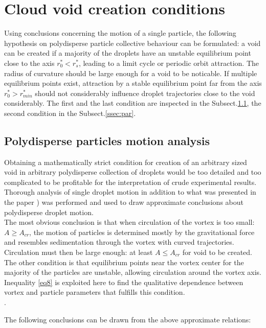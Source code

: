\documentclass[../main.tex]{subfiles}
\begin{document}
\section{Cloud void creation conditions}
\label{ch4s2}
Using conclusions concerning the motion of a single particle, the following hypothesis on polydisperse particle collective behaviour can be formulated: a void can be created if a majority of the droplets have an unstable equilibrium point close to the axis $r^{\ast}_0<r^{\ast}_s$, leading to a limit cycle or periodic orbit attraction. The radius of curvature should be large enough for a void to be noticable. If multiple equilibrium points exist, attraction by a stable equilibrium point far from the axis $r^{\ast}_0>r^{\ast}_{min}$ should not considerably influence droplet trajectories close to the void considerably. The first and the last condition are inspected in the Subsect.\ref{ssec:poly}, the second  condition in the  Subsect.\ref{ssec:par}.

\subsection{Polydisperse particles motion analysis}
\label{ssec:poly}
Obtaining a mathematically strict condition for creation of an arbitrary sized void in arbitrary polydisperse collection of droplets would be too detailed and too complicated to be profitable for the interpretation of crude experimental results. Thorough analysis of single droplet motion in addition to what was presented in the paper \citep{Marcu_95}) was performed and used to draw approximate conclusions about polydisperse droplet motion.\\
The most obvious conclusion is that when circulation of the vortex is too small: $A \geq A_{cr}$,  the motion of particles is determined mostly by the gravitational force and resembles sedimentation through the vortex with curved trajectories. Circulation must then be large enough: at least $A \leq A_{cr}$ for void to be created.\\
The other condition is that equilibrium points near the vortex center for the majority of the particles are unstable, allowing circulation around the vortex axis. Inequality \ref{eq8} is exploited here to find the qualitative dependence between vortex and particle parameters that fulfills this condition.\\
.

\noindent The following conclusions can be drawn from the above approximate relations:
\end{document}
